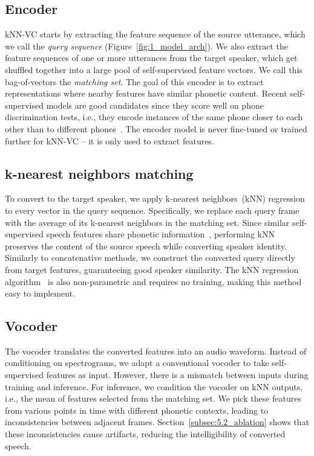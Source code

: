 \documentclass{INTERSPEECH2023}
\def\modelname{{kNN-VC}}
\begin{document}
\subsection{Encoder}

\modelname{} starts by extracting the feature sequence of the source utterance, which we call the \textit{query sequence} (Figure~\ref{fig:1_model_arch}).
We also extract the feature sequences of one or more utterances from the target speaker, which get shuffled together into a large pool of self-supervised feature vectors.
We call this bag-of-vectors the \textit{matching set}.
The goal of this encoder is to extract representations where nearby features have similar phonetic content.
Recent self-supervised models \cite{wav2vec2.0, chen2022wavlm} are good candidates since they score well on phone discrimination tests, i.e., they encode instances of the same phone closer to each other than to different phones~\cite{zerospeech}.
The encoder model is never fine-tuned or trained further for \modelname{} -- it is only used to extract features.




\subsection{k-nearest neighbors matching}

To convert to the target speaker, we apply k-nearest neighbors~(kNN) regression to every vector in the query sequence.
Specifically, we replace each query frame with the average of its k-nearest neighbors in the matching set.
Since similar self-supervised speech features share phonetic information~\cite{chen2022wavlm,wavlm_prosody_weights2023}, performing kNN preserves the content of the source speech while converting speaker identity.
Similarly to concatenative methods, we construct the converted query directly from target features, guaranteeing good speaker similarity.
The kNN regression algorithm~\cite{knn_fix1985discriminatory} is also non-parametric and requires no training, making this method easy to implement.








\subsection{Vocoder}



The vocoder translates the converted features into an audio waveform.
Instead of conditioning on spectrograms, we adapt a conventional vocoder to take self-supervised features as input.
However, there is a mismatch between inputs during training and inference.
For inference, we condition the vocoder on kNN outputs, i.e., the mean of features selected from the matching set.
We pick these features from various points in time with different phonetic contexts, leading to inconsistencies between adjacent frames.
Section~\ref{subsec:5.2_ablation} shows that these inconsistencies cause artifacts, reducing the intelligibility of converted speech.
\end{document}
